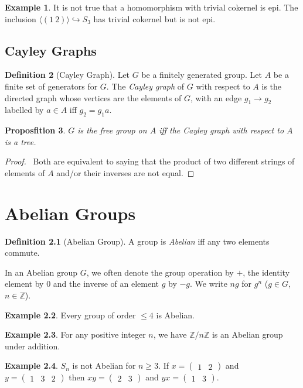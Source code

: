 \documentclass{book}
\let\qed\relax
\newtheorem{prop}{Proposfition}[chapter]
\theoremstyle{definition}
\newtheorem{df}[prop]{Definition}
\newtheorem{ex}[prop]{Example}
\begin{document}
\begin{ex}
It is not true that a homomorphism with trivial cokernel is epi. The inclusion $\langle (1\ 2) \rangle \hookrightarrow S_3$ has trivial cokernel but is not epi.
\end{ex}

\section{Cayley Graphs}

\begin{df}[Cayley Graph]
Let $G$ be a finitely generated group. Let $A$ be a finite set of generators for $G$. The \emph{Cayley graph} of $G$ with respect to $A$ is the directed graph whose vertices are the elements of $G$, with an edge $g_1 \rightarrow g_2$ labelled by $a \in A$ iff $g_2 = g_1 a$.
\end{df}

\begin{prop}
$G$ is the free group on $A$ iff the Cayley graph with respect to $A$ is a tree.
\end{prop}

\begin{proof}
\pf\ Both are equivalent to saying that the product of two different strings of elements of $A$ and/or their inverses are not equal. \qed
\end{proof}

\chapter{Abelian Groups}

\begin{df}[Abelian Group]
    A group is \emph{Abelian} iff any two elements commute.
\end{df}

In an Abelian group $G$, we often denote the group operation by $+$, the
identity element by $0$ and the inverse of an element $g$ by $-g$. We write
$ng$ for $g^n$ ($g \in G$, $n \in \mathbb{Z}$).

\begin{ex}
    Every group of order $\leq 4$ is Abelian.
\end{ex}

\begin{ex}
    For any positive integer $n$, we have $\mathbb{Z} / n \mathbb{Z}$ is an Abelian group under addition.
\end{ex}

\begin{ex}
    $S_n$ is not Abelian for $n \geq 3$. If $x = \left( \begin{array}{cc} 1 & 2 \end{array} \right)$ and $y = \left( \begin{array}{ccc} 1 & 3 & 2 \end{array} \right)$ then $xy = \left( \begin{array}{cc} 2 & 3 \end{array} \right)$ and $yx = \left( \begin{array}{cc} 1 & 3 \end{array} \right)$.
\end{ex}
\end{document}
